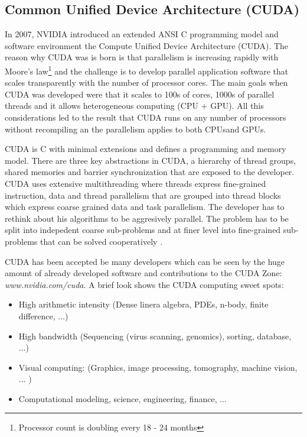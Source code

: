 \subsection*{Common Unified Device Architecture (CUDA)} %
\label{sub:common_unified_device_architecture_cuda_}
In 2007, NVIDIA introduced an extended ANSI C programming model and software
environment the Compute Unified Device Architecture (CUDA). The reason why CUDA
was is born is that parallelism is increasing rapidly with Moore's
law\footnote{Processor count is doubling every 18 - 24 months} and the challenge
is to develop parallel application software that scales transparently with the
number of processor cores. The main goals when \gls{CUDA} was developed were that it
scales to 100s of cores, 1000s of parallel threads and it allows heterogeneous
computing (CPU + GPU). All this considerations led to the result that \gls{CUDA} runs
on any number of processors without recompiling an the parallelism applies to
both \glspl{CPU}and \glspl{GPU}\citep{citeulike:3839013}.

CUDA is C with minimal extensions and defines a programming and memory model.
There are three key abstractions in CUDA, a hierarchy of thread groups, shared
memories and barrier synchronization \citep{citeulike:3325943} that are exposed
to the developer. \gls{CUDA} uses extensive multithreading where threads express
fine-grained instruction, data and thread parallelism that are grouped into
thread blocks which express coarse grained data and task parallelism. The
developer has to rethink about his algorithms to be aggresively parallel.
The problem has to be split into indepedent coarse sub-problems and at finer
level into fine-grained sub-problems that can be solved cooperatively
\citep{citeulike:3325943}.

CUDA has been accepted be many developers which can be seen by the huge amount
of already developed software and contributions to the \gls{CUDA} Zone:
\emph{www.nvidia.com/cuda}. A brief look shows the \gls{CUDA} computing sweet 
spots\citep{citeulike:3839013}: 
\begin{itemize} 
	\item High arithmetic intensity (Dense linera algebra, PDEs, n-body, 
			finite difference, ...) 
	\item High bandwidth (Sequencing (virus scanning, genomics), sorting, 			
			database, ...) 
	\item Visual computing: (Graphics, image processing, tomography, 
			machine vision, ... ) 
	\item Computational modeling, science, engineering, finance, ... 			
\end{itemize}


